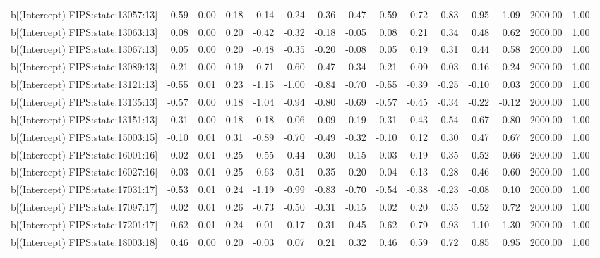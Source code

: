 \begin{table}[ht]
\begin{tabular}{rrrrrrrrrrrrrrr}
  b[(Intercept) FIPS:state:13057:13] & 0.59 & 0.00 & 0.18 & 0.14 & 0.24 & 0.36 & 0.47 & 0.59 & 0.72 & 0.83 & 0.95 & 1.09 & 2000.00 & 1.00 \\ 
  b[(Intercept) FIPS:state:13063:13] & 0.08 & 0.00 & 0.20 & -0.42 & -0.32 & -0.18 & -0.05 & 0.08 & 0.21 & 0.34 & 0.48 & 0.62 & 2000.00 & 1.00 \\ 
  b[(Intercept) FIPS:state:13067:13] & 0.05 & 0.00 & 0.20 & -0.48 & -0.35 & -0.20 & -0.08 & 0.05 & 0.19 & 0.31 & 0.44 & 0.58 & 2000.00 & 1.00 \\ 
  b[(Intercept) FIPS:state:13089:13] & -0.21 & 0.00 & 0.19 & -0.71 & -0.60 & -0.47 & -0.34 & -0.21 & -0.09 & 0.03 & 0.16 & 0.24 & 2000.00 & 1.00 \\ 
  b[(Intercept) FIPS:state:13121:13] & -0.55 & 0.01 & 0.23 & -1.15 & -1.00 & -0.84 & -0.70 & -0.55 & -0.39 & -0.25 & -0.10 & 0.03 & 2000.00 & 1.00 \\ 
  b[(Intercept) FIPS:state:13135:13] & -0.57 & 0.00 & 0.18 & -1.04 & -0.94 & -0.80 & -0.69 & -0.57 & -0.45 & -0.34 & -0.22 & -0.12 & 2000.00 & 1.00 \\ 
  b[(Intercept) FIPS:state:13151:13] & 0.31 & 0.00 & 0.18 & -0.18 & -0.06 & 0.09 & 0.19 & 0.31 & 0.43 & 0.54 & 0.67 & 0.80 & 2000.00 & 1.00 \\ 
  b[(Intercept) FIPS:state:15003:15] & -0.10 & 0.01 & 0.31 & -0.89 & -0.70 & -0.49 & -0.32 & -0.10 & 0.12 & 0.30 & 0.47 & 0.67 & 2000.00 & 1.00 \\ 
  b[(Intercept) FIPS:state:16001:16] & 0.02 & 0.01 & 0.25 & -0.55 & -0.44 & -0.30 & -0.15 & 0.03 & 0.19 & 0.35 & 0.52 & 0.66 & 2000.00 & 1.00 \\ 
  b[(Intercept) FIPS:state:16027:16] & -0.03 & 0.01 & 0.25 & -0.63 & -0.51 & -0.35 & -0.20 & -0.04 & 0.13 & 0.28 & 0.46 & 0.60 & 2000.00 & 1.00 \\ 
  b[(Intercept) FIPS:state:17031:17] & -0.53 & 0.01 & 0.24 & -1.19 & -0.99 & -0.83 & -0.70 & -0.54 & -0.38 & -0.23 & -0.08 & 0.10 & 2000.00 & 1.00 \\ 
  b[(Intercept) FIPS:state:17097:17] & 0.02 & 0.01 & 0.26 & -0.73 & -0.50 & -0.31 & -0.15 & 0.02 & 0.20 & 0.35 & 0.52 & 0.72 & 2000.00 & 1.00 \\ 
  b[(Intercept) FIPS:state:17201:17] & 0.62 & 0.01 & 0.24 & 0.01 & 0.17 & 0.31 & 0.45 & 0.62 & 0.79 & 0.93 & 1.10 & 1.30 & 2000.00 & 1.00 \\ 
  b[(Intercept) FIPS:state:18003:18] & 0.46 & 0.00 & 0.20 & -0.03 & 0.07 & 0.21 & 0.32 & 0.46 & 0.59 & 0.72 & 0.85 & 0.95 & 2000.00 & 1.00 \\ 

\end{tabular}
\end{table}
